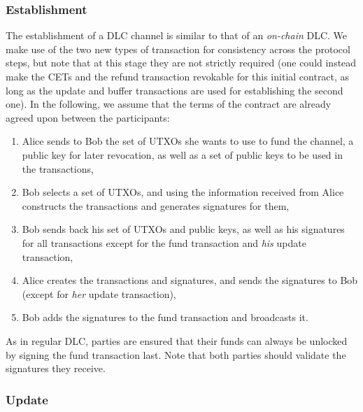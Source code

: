 \subsubsection{Establishment}
The establishment of a DLC channel is similar to that of an \emph{on-chain} DLC.
We make use of the two new types of transaction for consistency across the protocol steps, but note that at this stage they are not strictly required (one could instead make the CETs and the refund transaction revokable for this initial contract, as long as the update and buffer transactions are used for establishing the second one).
In the following, we assume that the terms of the contract are already agreed upon between the participants:
\begin{enumerate}
  \item Alice sends to Bob the set of UTXOs she wants to use to fund the channel, a public key for later revocation, as well as a set of public keys to be used in the transactions,
  \item Bob selects a set of UTXOs, and using the information received from Alice constructs the transactions and generates signatures for them,
  \item Bob sends back his set of UTXOs and public keys, as well as his signatures for all transactions except for the fund transaction and \emph{his} update transaction,
  \item Alice creates the transactions and signatures, and sends the signatures to Bob (except for \emph{her} update transaction),
  \item Bob adds the signatures to the fund transaction and broadcasts it.
\end{enumerate}

As in regular DLC, parties are ensured that their funds can always be unlocked by signing the fund transaction last.
Note that both parties should validate the signatures they receive.

\subsubsection{Update}

